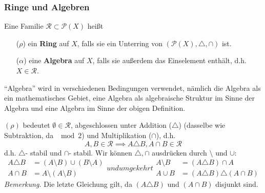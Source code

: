 \subsubsection{Ringe und Algebren}
\begin{definition}
\begin{mdframed}
Eine Familie $\mathcal{R}\subset \mathcal{P}(X)$ heißt
\begin{enumerate}[itemsep=0pt,topsep=3pt]
\item[($\rho$)] ein \textbf{Ring} auf $X$, falls sie ein Unterring von $(\mathcal{P}(X), \triangle, \cap)$ ist.
\item[($\alpha$)] eine \textbf{Algebra} auf $X$, falls sie außerdem das Einselement enthält, d.h. $X \in \mathcal{R}$.
\end{enumerate}
\end{mdframed}
\end{definition}
\begin{remark}
\begin{small}
``Algebra'' wird in verschiedenen Bedingungen verwendet, nämlich die Algebra als ein mathematisches Gebiet, eine Algebra als algebraische Struktur im Sinne der Algebra und eine Algebra im Sinne der obigen Definition.
\end{small}
\end{remark}
$(\rho)$ bedeutet $\emptyset \in \mathcal{R}$, abgeschlossen unter Addition ($\triangle$) (dasselbe wie Subtraktion, da $\mod 2$) und Multiplikation ($\cap$), d.h.
\begin{equation}
A,B \in \mathcal{R} \implies A\triangle B, A\cap B \in \mathcal{R}
\end{equation} 
d.h. $\triangle$- stabil und $\cap$- stabil. Wir können $\triangle, \cap$ ausdrücken durch $\setminus$ und $\cup$:
\begin{subequations}
\begin{align}
A \triangle B & = (A \setminus B) \cup (B \setminus A) \\
A \cap B & = A \setminus (A \setminus B)
\end{align}
und umgekehrt
\begin{align}
A \setminus B &= (A \triangle B) \cap A \\
A \cup B &= (A \triangle B) \triangle (A \cap B)
\end{align}
\end{subequations}
\textit{Bemerkung.} Die letzte Gleichung gilt, da $(A\triangle B)$ und $(A\cap B)$ disjunkt sind. \newline \newline
